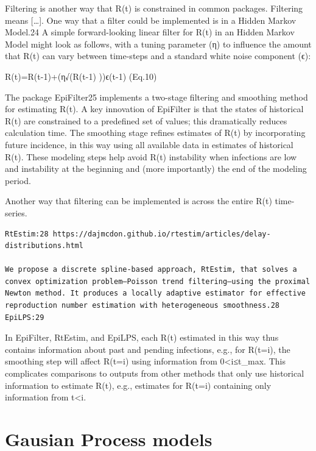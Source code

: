 \documentclass[
  letterpaper,
  DIV=11,
  numbers=noendperiod]{scrreprt}
\begin{document}
Filtering is another way that R(t) is constrained in common packages.
Filtering means {[}\ldots{]}. One way that a filter could be implemented
is in a Hidden Markov Model.24 A simple forward-looking linear filter
for R(t) in an Hidden Markov Model might look as follows, with a tuning
parameter (η) to influence the amount that R(t) can vary between
time-steps and a standard white noise component (ϵ):

R(t)=R(t-1)+(η√(R(t-1) ))ϵ(t-1) (Eq.10)

The package EpiFilter25 implements a two-stage filtering and smoothing
method for estimating R(t). A key innovation of EpiFilter is that the
states of historical R(t) are constrained to a predefined set of values;
this dramatically reduces calculation time. The smoothing stage refines
estimates of R(t) by incorporating future incidence, in this way using
all available data in estimates of historical R(t). These modeling steps
help avoid R(t) instability when infections are low and instability at
the beginning and (more importantly) the end of the modeling period.

Another way that filtering can be implemented is across the entire R(t)
time-series.

\begin{verbatim}
RtEstim:28 https://dajmcdon.github.io/rtestim/articles/delay-distributions.html

We propose a discrete spline-based approach, RtEstim, that solves a convex optimization problem—Poisson trend filtering—using the proximal Newton method. It produces a locally adaptive estimator for effective reproduction number estimation with heterogeneous smoothness.28
EpiLPS:29
\end{verbatim}

In EpiFilter, RtEstim, and EpiLPS, each R(t) estimated in this way thus
contains information about past and pending infections, e.g., for
R(t=i), the smoothing step will affect R(t=i) using information from
0\textless i≤t\_max. This complicates comparisons to outputs from other
methods that only use historical information to estimate R(t), e.g.,
estimates for R(t=i) containing only information from t\textless i.

\section*{Gausian Process models}\label{sec-gaussianprocess}

\end{document}

